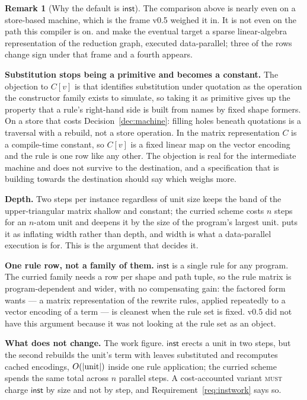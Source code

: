 \documentclass[11pt,a4paper]{article}
\newcommand{\MUST}{\textsc{must}}
\newcommand{\inst}{\mathsf{inst}}
\theoremstyle{definition}
\newtheorem{remark}[definition]{Remark}
\theoremstyle{plain}
\begin{document}
\begin{remark}[Why the default is $\inst$]\label{rem:whyinst}
The comparison above is nearly even on a store-based machine, which is the
frame v0.5 weighed it in. It is not even on the path this compiler is on.
\cite{matrix} and \cite{matspec} make the eventual target a sparse
linear-algebra representation of the reduction graph, executed data-parallel;
three of the rows change sign under that frame and a fourth appears.

\textbf{Substitution stops being a primitive and becomes a constant.} The
objection to $C[v]$ is that \cite[\S3.6]{draft3} identifies substitution under
quotation as the operation the constructor family exists to simulate, so
taking it as primitive gives up the property that a rule's right-hand side is
built from names by fixed shape formers. On a store that costs
Decision~\ref{dec:machine}: filling holes beneath quotations is a traversal
with a rebuild, not a store operation. In the matrix representation $C$ is a
compile-time constant, so $C[v]$ is a fixed linear map on the vector encoding
and the rule is one row like any other. The objection is real for the
intermediate machine and does not survive to the destination, and a
specification that is building towards the destination should say which
weighs more.

\textbf{Depth.} Two steps per instance regardless of unit size keeps the band
of the upper-triangular matrix shallow and constant; the curried scheme costs
$n$ steps for an $n$-atom unit and deepens it by the size of the program's
largest unit. \cite[Rem.~6.22]{draft3} puts it as inflating width rather than
depth, and width is what a data-parallel execution is for. This is the
argument that decides it.

\textbf{One rule row, not a family of them.} $\inst$ is a single rule for any
program. The curried family needs a row per shape and path tuple, so the rule
matrix is program-dependent and wider, with no compensating gain: the factored
form \cite{matrix} wants --- a matrix representation of the rewrite rules,
applied repeatedly to a vector encoding of a term --- is cleanest when the
rule set is fixed. v0.5 did not have this argument because it was not looking
at the rule set as an object.

\textbf{What does not change.} The work figure. $\inst$ erects a unit in two
steps, but the second rebuilds the unit's term with leaves substituted and
recomputes cached encodings, $O(|{\rm unit}|)$ inside one rule application;
the curried scheme spends the same total across $n$ parallel steps. A
cost-accounted variant \MUST{} charge $\inst$ by size and not by step, and
Requirement~\ref{req:instwork} says so.
\end{remark}
\end{document}
